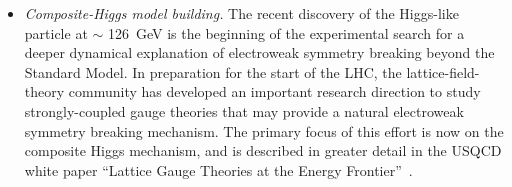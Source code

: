 \begin{itemize}

\item {\it Composite-Higgs model building.}  The recent discovery of the
Higgs-like particle at $\sim$ 126~GeV is the beginning of the experimental
search for a deeper dynamical explanation of electroweak symmetry breaking
beyond the Standard Model.  In preparation for the start of the LHC, the
lattice-field-theory community has developed an important research direction
to study strongly-coupled gauge theories that may provide a natural
electroweak symmetry breaking mechanism.  The primary focus of this effort is
now on the composite Higgs mechanism, and is described in greater detail in
the USQCD white paper ``Lattice Gauge Theories at the Energy
Frontier''~\cite{USQCD_EF_whitepaper13}.


\end{itemize}
